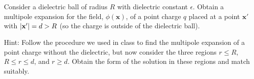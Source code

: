 \documentclass[11pt]{article}
\renewcommand{\vec}[1]{\mathbf{#1}}
\newenvironment{statement}[1]
{
	\section{#1}
	\color{darkgray}
	\ignorespaces
}
{
}
\begin{document}
\newcommand{\eps}{\epsilon}
\newcommand{\vx}{\vec{x}}
\newcommand{\phix}{\phi(\vx)}
\newcommand{\vp}{\vec{p}}
\newcommand{\dcx}{\dd[3]{x}}
\newcommand{\dcxp}{\dd[3]{x'}}
\newcommand{\rhox}{\rho(\vx)}
\newcommand{\rhoxp}{\rho(\vx')}
\newcommand{\xh}{\vec{\hat{x}}}
\newcommand{\absx}{\abs{\vx}}
\newcommand{\absxp}{\abs{\vx'}}

\newcommand{\Ylm}{Y_{l m}}
\newcommand{\qlm}{q_{l m}}
\newcommand{\Plm}{P_l^m}
\newcommand{\tht}{\theta}
\newcommand{\cost}{\cos\tht}
\newcommand{\vph}{\varphi}
\newcommand{\tv}{(\tht, \vph)}
\newcommand{\tvp}{(\tht', \vph')}
\newcommand{\Gxxp}{G(\vx, \vx')}
\newcommand{\qplm}{q'_{l m}}

\newcommand{\lap}{\nabla^2}
\newcommand{\evphi}{\ev{\phi}}
\newcommand{\evphix}{\evphi\!(\vx)}
\newcommand{\rhof}{\rho_f}
\newcommand{\fe}{\frac{1}{\eps}}
\newcommand{\tif}{\text{if }}
\newcommand{\Al}{A_l}
\newcommand{\Bl}{B_l}
\newcommand{\Cl}{C_l}

\newcommand{\intoi}{\int_0^\infty}
\newcommand{\intono}{\int_{-1}^{1}}
\newcommand{\intotp}{\int_0^{2\pi}}
\newcommand{\drp}{\dd{r'}}
\newcommand{\dctp}{\dd{(\cost')}}
\newcommand{\dvp}{\dd{\vph'}}

\begin{statement}{}
	Consider a dielectric ball of radius $R$ with dielectric constant $\eps$.  Obtain a multipole expansion for the field, $\phix$, of a point charge $q$ placed at a point $\vx'$ with $\abs{\vx'} = d > R$ (so the charge is outside of the dielectric ball).
	
	Hint: Follow the procedure we used in class to find the multipole expansion of a point charge without the dielectric, but now consider the three regions $r \leq R$, $R \leq r \leq d$, and $r \geq d$.  Obtain the form of the solution in these regions and match suitably.
\end{statement}
\end{document}
